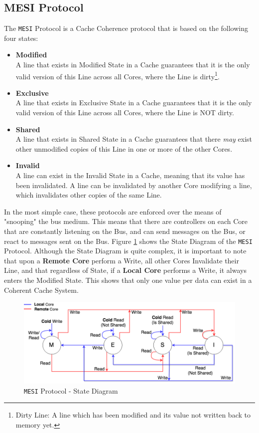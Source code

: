 \documentclass[bsc,frontabs,twoside,singlespacing,parskip,deptreport]{infthesis}     %
\begin{document}
\subsection{MESI Protocol}\label{sec:mesi-protocol}
The \texttt{MESI} Protocol is a Cache Coherence protocol that is based on the following four states:
\begin{itemize}
    \item \textbf{Modified} \\
    A line that exists in Modified State in a Cache guarantees that it is the only valid version of this Line across all Cores, where the Line is dirty\footnote{Dirty Line: A line which has been modified and its value not written back to memory yet.}.
    \item \textbf{Exclusive} \\
    A line that exists in Exclusive State in a Cache guarantees that it is the only valid version of this Line across all Cores, where the Line is NOT dirty.
    \item \textbf{Shared} \\
    A line that exists in Shared State in a Cache guarantees that there \emph{may} exist other unmodified copies of this Line in one or more of the other Cores.
    \item \textbf{Invalid} \\
    A line can exist in the Invalid State in a Cache, meaning that its value has been invalidated. A line can be invalidated by another Core modifying a line, which invalidates other copies of the same Line.
\end{itemize}
In the most simple case, these protocols are enforced over the means of "snooping" the bus medium. This means that there are controllers on each Core that are constantly listening on the Bus, and can send messages on the Bus, or react to messages sent on the Bus. Figure \ref{fig:mesi-state} shows the State Diagram of the \texttt{MESI} Protocol. Although the State Diagram is quite complex, it is important to note that upon a \textbf{Remote Core} perform a Write, all other Cores Invalidate their Line, and that regardless of State, if a \textbf{Local Core} performs a Write, it always enters the Modified State. This shows that only one value per data can exist in a Coherent Cache System. 

\begin{figure}[!h]
    \centering
    \includegraphics[width=15cm]{MESI.png}
    \caption{\texttt{MESI} Protocol - State Diagram}
    \label{fig:mesi-state}
\end{figure}
\end{document}
